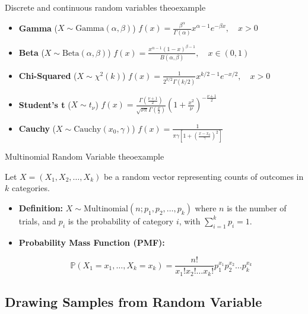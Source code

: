 \documentclass{tufte-handout}
\begin{document}
\begin{mybox}{Discrete and continuous random variables }{theoexample}
\begin{itemize}
    \item \textbf{Gamma} ($X \sim \text{Gamma}(\alpha, \beta)$)  
    $f(x) = \frac{\beta^\alpha}{\Gamma(\alpha)} x^{\alpha - 1} e^{-\beta x}, \quad x > 0$

    \item \textbf{Beta} ($X \sim \text{Beta}(\alpha, \beta)$)  
    $f(x) = \frac{x^{\alpha - 1} (1 - x)^{\beta - 1}}{B(\alpha, \beta)}, \quad x \in (0,1)$

    \item \textbf{Chi-Squared} ($X \sim \chi^2(k)$)  
    $f(x) = \frac{1}{2^{k/2} \Gamma(k/2)} x^{k/2 - 1} e^{-x/2}, \quad x > 0$

    \item \textbf{Student's t} ($X \sim t_\nu$)  
    $f(x) = \frac{\Gamma\left(\frac{\nu + 1}{2}\right)}{\sqrt{\nu \pi} \Gamma\left(\frac{\nu}{2}\right)} \left(1 + \frac{x^2}{\nu}\right)^{-\frac{\nu + 1}{2}}$

    \item \textbf{Cauchy} ($X \sim \text{Cauchy}(x_0, \gamma)$)  
    $f(x) = \frac{1}{\pi \gamma \left[1 + \left(\frac{x - x_0}{\gamma}\right)^2\right]}$
\end{itemize}

\end{mybox}

\begin{mybox}{Multinomial Random Variable }{theoexample}
\small

Let $X = (X_1, X_2, \dots, X_k)$ be a random vector representing counts of outcomes in $k$ categories.

\begin{itemize}
    \item \textbf{Definition:}  
    $X \sim \text{Multinomial}(n; p_1, p_2, \dots, p_k)$  
    where $n$ is the number of trials, and $p_i$ is the probability of category $i$, with $\sum_{i=1}^k p_i = 1$.

    \item \textbf{Probability Mass Function (PMF):}  
    

\[
    \mathbb{P}(X_1 = x_1, \dots, X_k = x_k) = \frac{n!}{x_1! x_2! \dots x_k!} p_1^{x_1} p_2^{x_2} \dots p_k^{x_k}
    \]

\end{itemize}
\end{mybox}

\subsection{Drawing Samples from  Random Variable}
\end{document}
